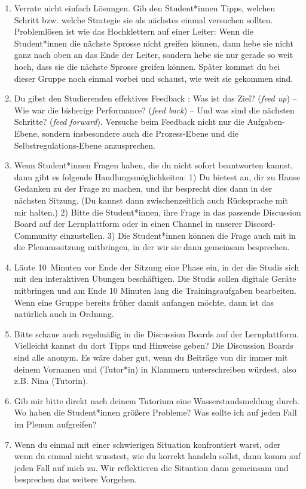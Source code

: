 \documentclass{cssheet}
\begin{document}
\begin{enumerate}
\item Verrate nicht einfach Lösungen. Gib den Student*innen Tipps, welchen Schritt bzw. welche Strategie sie als nächstes einmal versuchen sollten. Problemlösen ist wie das Hochklettern auf einer Leiter: Wenn die Student*innen die nächste Sprosse nicht greifen können, dann hebe sie nicht ganz nach oben an das Ende der Leiter, sondern hebe sie nur gerade so weit hoch, dass sie die nächste Sprosse greifen können. Später kommst du bei dieser Gruppe noch einmal vorbei und schaust, wie weit sie gekommen sind.
\item Du gibst den Studierenden effektives Feedback \parencite{hattie2007}: Was ist das Ziel? (\emph{feed up}) -- Wie war die bisherige Performance? (\emph{feed back}) -- Und was sind die nächsten Schritte? (\emph{feed forward}). Versuche beim Feedback nicht nur die Aufgaben-Ebene, sondern insbesondere auch die Prozess-Ebene und die Selbst\-re\-gu\-la\-tions-Ebene anzusprechen.
\item Wenn Student*innen Fragen haben, die du nicht sofort beantworten kannst, dann gibt es folgende Handlungsmöglichkeiten: 1) Du bietest an, dir zu Hause Gedanken zu der Frage zu machen, und ihr besprecht dies dann in der nächsten Sitzung. (Du kannst dann zwischenzeitlich auch Rücksprache mit mir halten.) 2) Bitte die Student*innen, ihre Frage in das passende Discussion Board auf der Lernplattform oder in einen Channel in unserer Discord-Community einzustellen. 3) Die Student*innen können die Frage auch mit in die Plenumssitzung mitbringen, in der wir sie dann gemeinsam besprechen.
\item Läute 10~Minuten vor Ende der Sitzung eine Phase ein, in der die Studis sich mit den interaktiven Übungen beschäftigen. Die Studis sollen digitale Geräte mitbringen und am Ende 10 Minuten lang die Trainingsaufgaben bearbeiten. Wenn eine Gruppe bereits früher damit anfangen möchte, dann ist das natürlich auch in Ordnung.
\item Bitte schaue auch regelmäßig in die Discussion Boards auf der Lernplattform. Vielleicht kannst du dort Tipps und Hinweise geben? Die Discussion Boards sind alle anonym. Es wäre daher gut, wenn du Beiträge von dir immer mit deinem Vornamen und \glqq{}(Tutor*in)\grqq{} in Klammern unterschreiben würdest, also z.B. \glqq{}Nina (Tutorin)\grqq{}.
\item Gib mir bitte direkt nach deinem Tutorium eine \glqq{}Wasserstandsmeldung\grqq{} durch. Wo haben die Student*innen größere Probleme? Was sollte ich auf jeden Fall im Plenum aufgreifen?
\item Wenn du einmal mit einer schwierigen Situation konfrontiert warst, oder wenn du einmal nicht wusstest, wie du korrekt handeln sollst, dann komm auf jeden Fall auf mich zu. Wir reflektieren die Situation dann gemeinsam und besprechen das weitere Vorgehen.
\end{enumerate}
\pagestyle{docstyle}


\printbibliography[title=Literatur,keyword=tutorien]

\vspace*{10mm}

\printlicense

\printsocials
\end{document}
